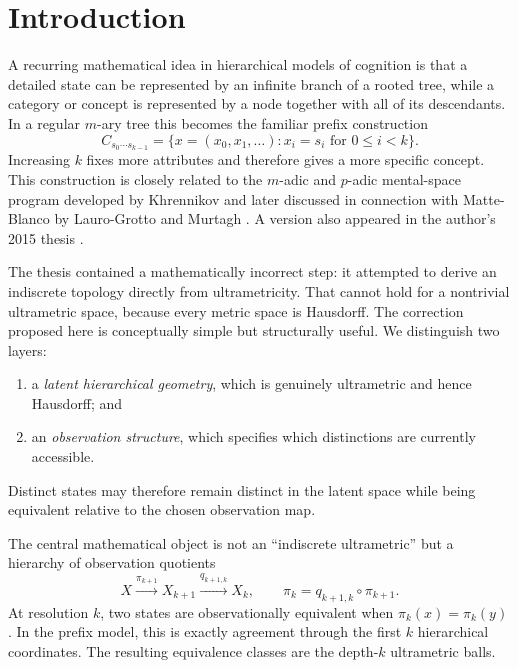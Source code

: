 \documentclass[11pt]{article}
\theoremstyle{definition}
\theoremstyle{remark}
\begin{document}
\section{Introduction}

A recurring mathematical idea in hierarchical models of cognition is that a detailed state can be represented by an infinite branch of a rooted tree, while a category or concept is represented by a node together with all of its descendants.  In a regular $m$-ary tree this becomes the familiar prefix construction
\[
C_{s_0\cdots s_{k-1}}
 = \{x=(x_0,x_1,\ldots):x_i=s_i\text{ for }0\le i<k\}.
\]
Increasing $k$ fixes more attributes and therefore gives a more specific concept.  This construction is closely related to the $m$-adic and $p$-adic mental-space program developed by Khrennikov and later discussed in connection with Matte-Blanco by Lauro-Grotto and Murtagh \cite{Khrennikov1998,Khrennikov2007,Khrennikov2010,LauroGrotto2008,Murtagh2012,Murtagh2014,Khrennikov2014}.  A version also appeared in the author's 2015 thesis \cite{Droncheff2015}.

The thesis contained a mathematically incorrect step: it attempted to derive an indiscrete topology directly from ultrametricity.  That cannot hold for a nontrivial ultrametric space, because every metric space is Hausdorff.  The correction proposed here is conceptually simple but structurally useful.  We distinguish two layers:
\begin{enumerate}[label=(\roman*)]
\item a \emph{latent hierarchical geometry}, which is genuinely ultrametric and hence Hausdorff; and
\item an \emph{observation structure}, which specifies which distinctions are currently accessible.
\end{enumerate}
Distinct states may therefore remain distinct in the latent space while being equivalent relative to the chosen observation map.

The central mathematical object is not an ``indiscrete ultrametric'' but a hierarchy of observation quotients
\[
X \xrightarrow{\pi_{k+1}} X_{k+1}
\xrightarrow{q_{k+1,k}} X_k,
\qquad
\pi_k=q_{k+1,k}\circ\pi_{k+1}.
\]
At resolution $k$, two states are observationally equivalent when $\pi_k(x)=\pi_k(y)$.  In the prefix model, this is exactly agreement through the first $k$ hierarchical coordinates.  The resulting equivalence classes are the depth-$k$ ultrametric balls.
\end{document}
